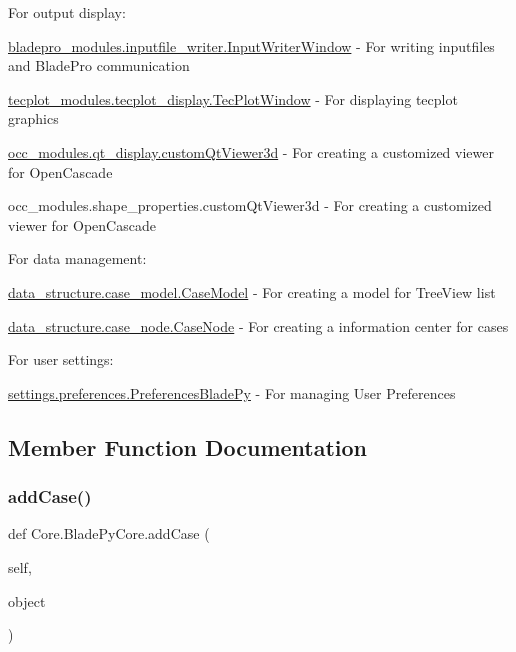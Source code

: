 For output display\+: \begin{DoxyItemize}
\item {\ttfamily \hyperlink{a00071}{bladepro\+\_\+modules.\+inputfile\+\_\+writer.\+Input\+Writer\+Window}} -\/ For writing inputfiles and Blade\+Pro communication \item {\ttfamily \hyperlink{a00111}{tecplot\+\_\+modules.\+tecplot\+\_\+display.\+Tec\+Plot\+Window}} -\/ For displaying tecplot graphics \item {\ttfamily \hyperlink{a00091}{occ\+\_\+modules.\+qt\+\_\+display.\+custom\+Qt\+Viewer3d}} -\/ For creating a customized viewer for Open\+Cascade \item {\ttfamily occ\+\_\+modules.\+shape\+\_\+properties.\+custom\+Qt\+Viewer3d} -\/ For creating a customized viewer for Open\+Cascade\end{DoxyItemize}
For data management\+: \begin{DoxyItemize}
\item {\ttfamily \hyperlink{a00083}{data\+\_\+structure.\+case\+\_\+model.\+Case\+Model}} -\/ For creating a model for Tree\+View list \item {\ttfamily \hyperlink{a00087}{data\+\_\+structure.\+case\+\_\+node.\+Case\+Node}} -\/ For creating a information center for cases\end{DoxyItemize}
For user settings\+: \begin{DoxyItemize}
\item {\ttfamily \hyperlink{a00103}{settings.\+preferences.\+Preferences\+Blade\+Py}} -\/ For managing User Preferences \end{DoxyItemize}


\subsection{Member Function Documentation}
\hypertarget{a00079_a1a62f9b5b8f5929bdb6f0a8c27049d9e}{}\label{a00079_a1a62f9b5b8f5929bdb6f0a8c27049d9e} 
\subsubsection{\texorpdfstring{add\+Case()}{addCase()}}
{\footnotesize\ttfamily def Core.\+Blade\+Py\+Core.\+add\+Case (\begin{DoxyParamCaption}\item[{}]{self,  }\item[{}]{object }\end{DoxyParamCaption})}



